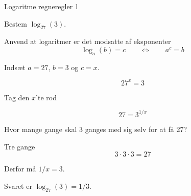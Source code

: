 \documentclass{article}
\begin{document}
\tableofcontents
\newpage

\begin{exercise}{Logaritme regneregler 1}

Bestem $\log_{27}(3)$.


\hint

Anvend at logaritmer er det modsatte af eksponenter
\[
\log_a(b) = c \qquad \Leftrightarrow \qquad a^c = b
\]

\hint

Indsæt $a=27$, $b=3$ og $c=x$.

\hint
\[
27^x = 3
\]

\hint
Tag den $x$'te rod

\hint
\[
27 = 3^{1/x}
\]

\hint
Hvor mange gange skal 3 ganges med sig selv for at få 27?

\hint
Tre gange
\[
3 \cdot 3 \cdot 3 = 27
\]

\hint
Derfor må $1/x = 3$.

\hint
Svaret er $\log_{27}(3) = 1/3$.

\end{exercise}

\newpage
\end{document}
